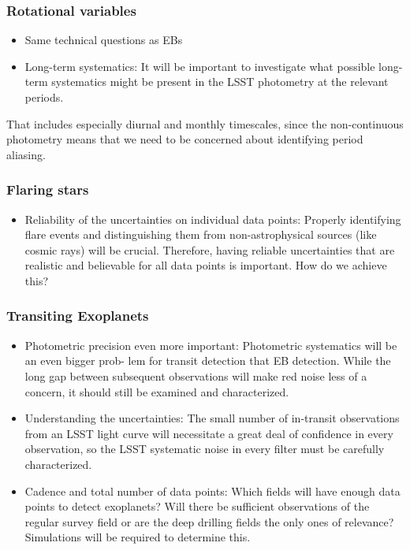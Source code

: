 \subsubsection{Rotational variables }
\begin{itemize}
\item Same technical questions as EBs 
\item{Long-term systematics: It will be important to investigate what possible long-term systematics might be present in the LSST photometry at the relevant periods. }
\end{itemize}

That includes especially diurnal and monthly timescales, since the non-continuous photometry means that we need to be concerned about identifying period aliasing. 

\subsubsection{Flaring stars }
\begin{itemize}
\item{Reliability of the uncertainties on individual data points: Properly identifying flare events and distinguishing them from non-astrophysical sources (like cosmic rays) will be crucial. Therefore, having reliable uncertainties that are realistic and believable for all data points is important. How do we achieve this? }
\end{itemize}

\subsubsection{Transiting Exoplanets }
\begin{itemize}
\item{Photometric precision even more important: Photometric systematics will be an even bigger prob- lem for transit detection that EB detection. While the long gap between subsequent observations will make red noise less of a concern, it should still be examined and characterized. }
\item{Understanding the uncertainties: The small number of in-transit observations from an LSST light curve will necessitate a great deal of confidence in every observation, so the LSST systematic noise in every filter must be carefully characterized. }
\item{Cadence and total number of data points: Which fields will have enough data points to detect exoplanets? Will there be sufficient observations of the regular survey field or are the deep drilling fields the only ones of relevance? Simulations will be required to determine this. }
\end{itemize}

